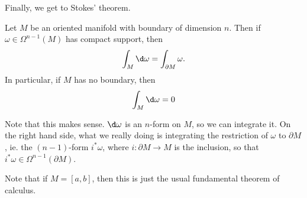 \documentclass[a4paper]{article}
\begin{document}
Finally, we get to Stokes' theorem.
\begin{thm}
  Let $M$ be an oriented manifold with boundary of dimension $n$. Then if $\omega \in \Omega^{n - 1}(M)$ has compact support, then
  \[
    \int_M \d \omega = \int_{\partial M}\omega.
  \]
  In particular, if $M$ has no boundary, then
  \[
    \int_M \d \omega = 0
  \]
\end{thm}
Note that this makes sense. $\d \omega$ is an $n$-form on $M$, so we can integrate it. On the right hand side, what we really doing is integrating the restriction of $\omega$ to $\partial M$, ie. the $(n - 1)$-form $i^* \omega$, where $i: \partial M \to M$ is the inclusion, so that $i^* \omega \in \Omega^{n - 1}(\partial M)$.

Note that if $M = [a, b]$, then this is just the usual fundamental theorem of calculus.
\end{document}
